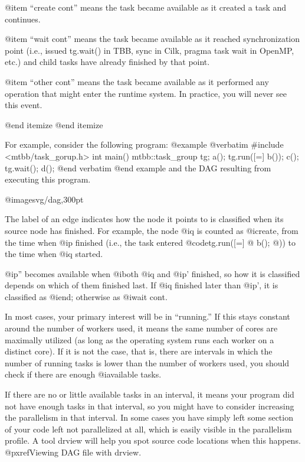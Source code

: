 @item ``create cont'' means the task became available as it created a task and continues.

@item ``wait cont'' means the task became available as it reached synchronization point (i.e., issued tg.wait() in TBB, sync in Cilk, pragma task wait in OpenMP, etc.) and child tasks have already finished by that point.

@item ``other cont'' means the task became available as it performed any operation that might enter the runtime system.  In practice, you will never see this event.

@end itemize
@end itemize

For example, consider the following program:
@example
@verbatim
#include <mtbb/task_gorup.h>
int main() {
  mtbb::task_group tg;
  a();
  tg.run([=] b());
  c();
  tg.wait();
  d();
}
@end verbatim
@end example
and the DAG resulting from executing this program.

@image{svg/dag,300pt}

The label of an edge indicates how the node it points to is classified
when its source node has finished.  For example, the node @i{q} is
counted as @i{create}, from the time when @i{p} finished (i.e., the task
entered @code{tg.run([=] @{ b(); @})}) to the time when @i{q} started.

@i{p''} becomes available when @i{both} @i{q} and @i{p'} finished, so
how it is classified depends on which of them finished last.  If @i{q}
finished later than @i{p'}, it is classified as @i{end}; otherwise as
@i{wait cont}.

In most cases, your primary interest will be in ``running.''  If this
stays constant around the number of workers used, it means the same
number of cores are maximally utilized (as long as the operating system
runs each worker on a distinct core).  If it is not the case, that is,
there are intervals in which the number of running tasks is lower than
the number of workers used, you should check if there are enough
@i{available} tasks.

If there are no or little available tasks in an interval, it means your
program did not have enough tasks in that interval, so you might have to
consider increasing the parallelism in that interval.  In some cases you
have simply left some section of your code left not parallelized at all,
which is easily visible in the parallelism profile.  A tool drview will
help you spot source code locations when this happens.  
@pxref{Viewing DAG file with drview}.

